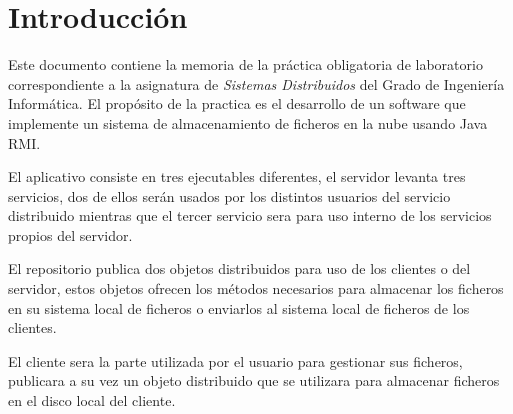 
\chapter{Introducción}

Este documento contiene la memoria de la práctica obligatoria de laboratorio correspondiente a la asignatura de \emph{Sistemas Distribuidos} del Grado de Ingeniería Informática. El propósito de la practica es el desarrollo de un software que implemente un sistema de almacenamiento de ficheros en la nube usando Java RMI.

El aplicativo consiste en tres ejecutables diferentes, el servidor levanta tres servicios, dos de ellos serán usados por los distintos usuarios del servicio distribuido mientras que el tercer servicio sera para uso interno de los servicios propios del servidor.

El repositorio publica dos objetos distribuidos para uso de los clientes o del servidor, estos objetos ofrecen los métodos necesarios para almacenar los ficheros en su sistema local de ficheros o enviarlos al sistema local de ficheros de los clientes.

El cliente sera la parte utilizada por el usuario para gestionar sus ficheros, publicara a su vez un objeto distribuido que se utilizara para almacenar ficheros en el disco local del cliente.
